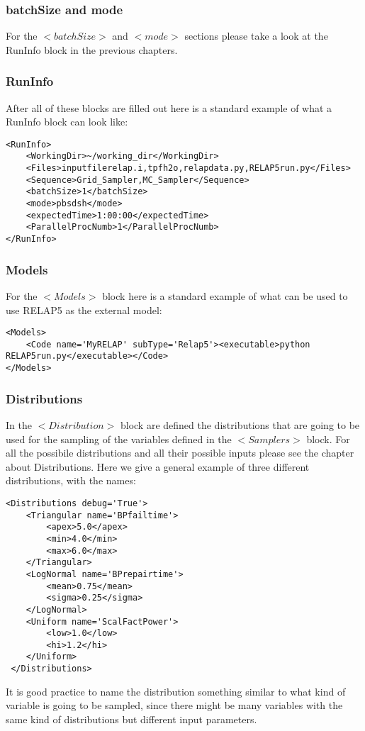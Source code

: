 \subsubsection{batchSize and mode}
For the $<batchSize>$ and $<mode>$ sections please take a look at the RunInfo block in the previous chapters.
\subsubsection{RunInfo}
After all of these blocks are filled out here is a standard example of what a RunInfo block can look like:
\begin{lstlisting}[style=XML]
<RunInfo>
    <WorkingDir>~/working_dir</WorkingDir>
    <Files>inputfilerelap.i,tpfh2o,relapdata.py,RELAP5run.py</Files>
    <Sequence>Grid_Sampler,MC_Sampler</Sequence>
    <batchSize>1</batchSize>
	<mode>pbsdsh</mode>
    <expectedTime>1:00:00</expectedTime>
    <ParallelProcNumb>1</ParallelProcNumb>
</RunInfo>
\end{lstlisting}
\subsubsection{Models}
For the $<Models>$ block here is a standard example of what can be used to use RELAP5 as the external model:
\begin{lstlisting}[style=XML]
<Models>
    <Code name='MyRELAP' subType='Relap5'><executable>python RELAP5run.py</executable></Code>
</Models>
\end{lstlisting}
\subsubsection{Distributions}
In the $<Distribution>$ block are defined the distributions that are going to be used for the sampling of the variables defined in the $<Samplers>$ block. For all the possibile distributions and all their possible inputs please see the chapter about Distributions. Here we give a general example of three different distributions, with the names:
\begin{lstlisting}[style=XML]
<Distributions debug='True'>
    <Triangular name='BPfailtime'>
        <apex>5.0</apex>
        <min>4.0</min>
		<max>6.0</max>
    </Triangular>
    <LogNormal name='BPrepairtime'>
        <mean>0.75</mean>
        <sigma>0.25</sigma>
    </LogNormal>
	<Uniform name='ScalFactPower'>
        <low>1.0</low>
        <hi>1.2</hi>
    </Uniform>
 </Distributions>
\end{lstlisting}
It is good practice to name the distribution something similar to what kind of variable is going to be sampled, since there might be many variables with the same kind of distributions but different input parameters. 
